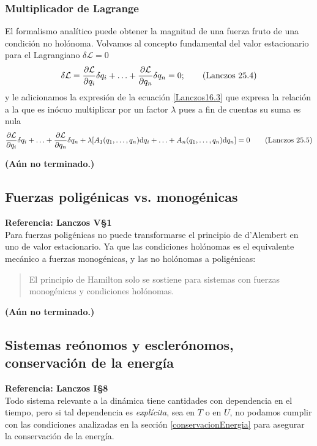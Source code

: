 \documentclass[12pt, spanish, a4paper, ]{article}
\begin{document}
\subsubsection{Multiplicador de Lagrange}
El formalismo analítico puede obtener la magnitud de una fuerza fruto de una condición no holónoma.
Volvamos al concepto fundamental del valor estacionario para el Lagrangiano \(\delta \mathcal{L} = 0\)
\begin{equation}\label{Lanczos25.4}
	\delta \mathcal{L} = \pdv{\mathcal{L}}{q_i} \delta q_i+ \ldots+ \pdv{\mathcal{L}}{q_n} \delta q_n= 0;
	\tag{Lanczos 25.4}
\end{equation}
y le adicionamos la expresión de la  ecuación \eqref{Lanczos16.3} que expresa la relación a la que es inócuo multiplicar por un factor \(\lambda\) pues a fin de cuentas su suma es nula
\begin{equation}\label{Lanczos25.5}
	\pdv{\mathcal{L}}{q_i} \delta q_i+ \ldots+ \pdv{\mathcal{L}}{q_n} \delta q_n + \lambda \qty[ A_1(q_1,\ldots,q_n) \dd q_i+\ldots+ A_n(q_1,\ldots,q_n) \dd q_n ] = 0
	\tag{Lanczos 25.5}
\end{equation}

\textbf{(Aún no terminado.)}


\subsection{Fuerzas poligénicas vs. monogénicas}
\textbf{Referencia: Lanczos V\S1}\\

Para fuerzas poligénicas no puede transformarse el principio de d'Alembert en uno de valor estacionario.
Ya que las condiciones holónomas es el equivalente mecánico a fuerzas monogénicas, y las no holónomas a poligénicas:
\begin{quote}
El principio de Hamilton solo se sostiene para sistemas con fuerzas monogénicas y condiciones holónomas.
\end{quote}

\textbf{(Aún no terminado.)}


\subsection{Sistemas reónomos y esclerónomos, conservación de la energía}
\textbf{Referencia: Lanczos I\S8}\\

Todo sistema relevante a la dinámica tiene cantidades con dependencia en el tiempo, pero si tal dependencia es \emph{explícita}, sea en \(T\) o en \(U\), no podamos cumplir con las condiciones analizadas en la sección \ref{conservacionEnergia} para asegurar la conservación de la energía.
\end{document}

